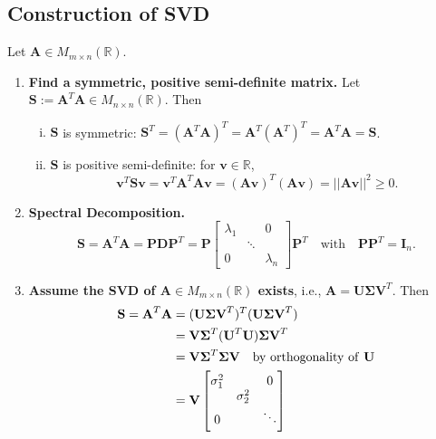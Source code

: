 \documentclass[12pt,openany]{book}
\theoremstyle{definition}
\newcommand{\R}{\mathbb{R}}
\newcommand{\ie}{\textnormal{i.e.}}
\newcommand{\by}{\times}
\newcommand{\norms}[1]{|| #1||}
\renewcommand{\vec}[1]{\textbf{#1}}
\begin{document}
	\newpage
	\subsection{Construction of SVD}
	
	Let \(\textbf{A}\in M_{m\by n}(\R)\).
	
	\begin{enumerate}[(Step 1)]
		\item \textbf{Find a symmetric, positive semi-definite matrix.} Let \(\textbf{S}:=\textbf{A}^T\textbf{A}\in M_{n\by n}(\R)\). Then
		\begin{enumerate}[(i)]
			\item \(\textbf{S}\) is symmetric: \(\textbf{S}^T=(\textbf{A}^T\textbf{A})^T=\textbf{A}^T(\textbf{A}^T)^T=\textbf{A}^T\textbf{A}=\textbf{S}\).
			\item \(\textbf{S}\) is positive semi-definite: for \(\vec{v}\in\R\),\[
			\vec{v}^T\textbf{S}\vec{v}=\vec{v}^T\textbf{A}^T\textbf{A}\vec{v}=(\textbf{A}\vec{v})^T(\textbf{A}\vec{v})=\norms{\textbf{A}\vec{v}}^2\geq 0.
			\]
		\end{enumerate}
		\vspace{4pt}
		\item \textbf{Spectral Decomposition.} \[
		\textbf{S}=\textbf{A}^T\textbf{A}=\textbf{P}\textbf{D}\textbf{P}^T=
		\textbf{P}\begin{bmatrix}
			\lambda_1&&0\\&\ddots&\\0&&\lambda_n
		\end{bmatrix}\textbf{P}^T\quad\text{with}\quad\textbf{PP}^T=\textbf{I}_n.
		\]
		\vspace{4pt}
		\item \textbf{Assume the SVD of A$\in M_{m\by n}(\R)$ exists}, \ie, \(\textbf{A}=\textbf{U}\boldsymbol{\Sigma}\textbf{V}^T\). Then
		\begin{align*}
			\textbf{S}=\textbf{A}^T\textbf{A}&=(\textbf{U}\boldsymbol{\Sigma}\textbf{V}^T)^T(\textbf{U}\boldsymbol{\Sigma}\textbf{V}^T)\\
			&=\textbf{V}\boldsymbol{\Sigma}^T(\textbf{U}^T\textbf{U})\boldsymbol{\Sigma}\textbf{V}^T\\
			&=\textbf{V}\boldsymbol{\Sigma}^T\boldsymbol{\Sigma}\textbf{V}\quad\text{by orthogonality of \textbf{U}}\\
			&=\textbf{V}\begin{bmatrix}
				\sigma_1^2 &  & 0\\
				 & \sigma_2^2 & \\
				0 &  & \ddots

\end{bmatrix}
\end{align*}
\end{enumerate}
\end{document}
